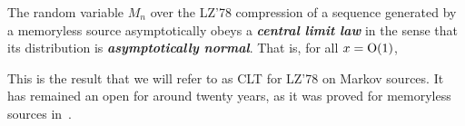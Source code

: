     \begin{theo}
        The random variable $M_n$ over the LZ'78 compression of a sequence 
        generated by a memoryless source asymptotically obeys a
        \emph{\bfseries central limit law} in the
        sense that its distribution is \emph{\bfseries asymptotically normal}.
        That is, for all $x = \grando(1)$,
        
    \end{theo}

    \begin{rmk}
        \label{rmk:clt}
        This is the result that we will refer to as CLT 
        for LZ'78 on Markov sources. It has remained an open
        for around twenty years, as it was proved for 
        memoryless sources in~\cite{jacquet_average_2001}.
    \end{rmk}

